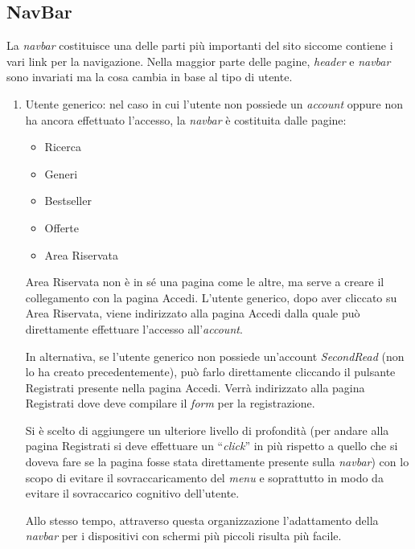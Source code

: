 \subsection{NavBar}
La \textit{navbar} costituisce una delle parti più importanti del sito siccome contiene i vari link per la navigazione. Nella maggior parte delle pagine, \textit{header} e \textit{navbar} sono invariati ma la cosa cambia in base al tipo di utente.
	\begin{enumerate}
		\item Utente generico: nel caso in cui l’utente non possiede un \textit{account} oppure non ha ancora effettuato l’accesso, la \textit{navbar} è costituita dalle pagine:
			\begin{itemize}
				\item Ricerca
				\item Generi
				\item Bestseller
				\item Offerte
				\item Area Riservata
			\end{itemize}
		Area Riservata non è in sé una pagina come le altre, ma serve a creare il collegamento con la pagina Accedi. L’utente generico, dopo aver cliccato su Area Riservata, viene indirizzato alla pagina Accedi dalla quale può direttamente effettuare l'accesso all'\textit{account}.

		In alternativa, se l’utente generico non possiede un’account \textit{SecondRead} (non lo ha creato precedentemente), può farlo direttamente cliccando il pulsante Registrati presente nella pagina Accedi. Verrà indirizzato alla pagina Registrati dove deve compilare il \textit{form} per la registrazione.

		Si è scelto di aggiungere un ulteriore livello di profondità (per andare alla pagina Registrati si deve effettuare un “\textit{click}” in più rispetto a quello che si doveva fare se la pagina fosse stata direttamente presente sulla \textit{navbar}) con lo scopo di evitare il sovraccaricamento del \textit{menu} e soprattutto in modo da evitare il sovraccarico cognitivo dell’utente.

		Allo stesso tempo, attraverso questa organizzazione l'adattamento della \textit{navbar} per i dispositivi con schermi più piccoli risulta più facile.


\end{enumerate}
